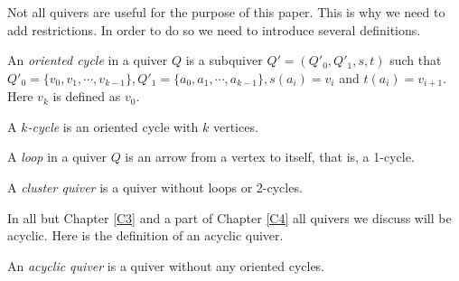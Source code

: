 \indent Not all quivers are useful for the purpose of this paper. This is why we need to add restrictions. In order to do so we need to introduce several definitions.\\
\begin{definition}
An \textit{oriented cycle} in a quiver $Q$ is a subquiver $Q' = (Q'_0, Q'_1, s, t)$ such that $Q'_0 = \{v_0,v_1,\cdots, v_{k-1}\},Q'_1 = \{a_0,a_1,\cdots, a_{k-1}\}, s(a_i) = v_i$ and $t(a_i) = v_{i+1}$. Here $v_k$ is defined as $v_0$.
\end{definition}
\begin{definition}
A \textit{$k$-cycle} is an oriented cycle with $k$ vertices.
\end{definition}
\begin{definition}
A \textit{loop} in a quiver $Q$ is an arrow from a vertex to itself, that is, a 1-cycle.
\end{definition}
\begin{definition}
A \textit{cluster quiver} is a quiver without loops or 2-cycles. 
\end{definition}
\indent In all but Chapter \ref{C3} and a part of Chapter \ref{C4} all quivers we discuss will be acyclic. Here is the definition of an acyclic quiver.\\
\begin{definition}
An \textit{acyclic quiver} is a quiver without any oriented cycles. 
\end{definition}

